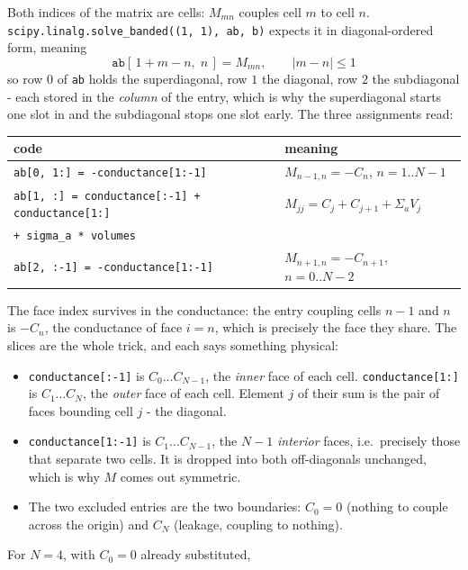 \documentclass[11pt]{article}
\begin{document}
{Both indices of the matrix are cells: $M_{mn}$ couples cell $m$ to cell $n$. \texttt{scipy.linalg.solve\_banded((1, 1), ab, b)} expects it in diagonal-ordered form, meaning
\begin{equation}
    \texttt{ab}[\,1 + m - n,\; n\,] = M_{mn}, \qquad |m - n| \le 1
\end{equation}
so row $0$ of \texttt{ab} holds the superdiagonal, row $1$ the diagonal, row $2$ the subdiagonal - each stored in the \emph{column} of the entry, which is why the superdiagonal starts one slot in and the subdiagonal stops one slot early. The three assignments read:
\begin{center}
\begin{tabular}{ll}
    \toprule
    code & meaning \\
    \midrule
    \texttt{ab[0, 1:] = -conductance[1:-1]} & $M_{n-1,n} = -C_n$, \quad $n = 1..N{-}1$ \\
    \texttt{ab[1, :] = conductance[:-1] + conductance[1:]} & $M_{jj} = C_j + C_{j+1} + \Sigma_a V_j$ \\
    \phantom{\texttt{ab[1, :] = }}\texttt{+ sigma\_a * volumes} & \\
    \texttt{ab[2, :-1] = -conductance[1:-1]} & $M_{n+1,n} = -C_{n+1}$, \quad $n = 0..N{-}2$ \\
    \bottomrule
\end{tabular}
\end{center}
The face index survives in the conductance: the entry coupling cells $n-1$ and $n$ is $-C_n$, the conductance of face $i = n$, which is precisely the face they share.
The slices are the whole trick, and each says something physical:
\begin{itemize}
    \item \texttt{conductance[:-1]} is $C_0 \dots C_{N-1}$, the \emph{inner} face of each cell. \texttt{conductance[1:]} is $C_1 \dots C_N$, the \emph{outer} face of each cell. Element $j$ of their sum is the pair of faces bounding cell $j$ - the diagonal.
    \item \texttt{conductance[1:-1]} is $C_1 \dots C_{N-1}$, the $N-1$ \emph{interior} faces, i.e.\ precisely those that separate two cells. It is dropped into both off-diagonals unchanged, which is why $M$ comes out symmetric.
    \item The two excluded entries are the two boundaries: $C_0 = 0$ (nothing to couple across the origin) and $C_N$ (leakage, coupling to nothing).
\end{itemize}
For $N = 4$, with $C_0 = 0$ already substituted,
}
\end{document}
